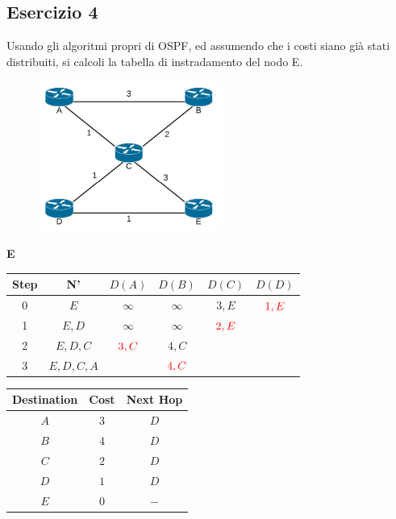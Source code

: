 \documentclass[10pt]{article}
\begin{document}
	\subsection{Esercizio 4}
	Usando gli algoritmi propri di OSPF, ed assumendo che i costi siano già stati distribuiti, si calcoli la tabella di instradamento del nodo E.
	\begin{figure}[h]
	\centering
	\includegraphics[width=6cm]{es5}
	\end{figure}
	\begin{center}
	\textbf{E}
 		\begin{tabular}{||c c c c c c||} 
 			\hline
 			Step & N' & $D(A)$ & $D(B)$ & $D(C)$ & $D(D)$ \\[0.5ex] 
 			\hline\hline
 			0 & $E$ & $\infty$ & $\infty$ & $3,E$ & $\color{red} 1,E$ \\
 			\hline
 			1 & $E,D$ & $\infty$ & $\infty$ & $\color{red} 2,E$ & \\
 			\hline
 			2 & $E,D,C$ & $\color{red} 3,C$ & $4,C$ &  & \\
 			\hline
 			3 & $E,D,C,A$ & & $\color{red} 4,C$ & & \\[0.5ex] 
 			\hline
		\end{tabular}
		\quad
		\begin{tabular}{||c || c || c||}
			\hline
 			Destination & Cost & Next Hop\\[0.5ex] 
 			\hline\hline
			$A$ & $3$ & $D$\\
			$B$ & $4$ & $D$\\
 			$C$ & $2$ & $D$\\
			$D$ & $1$ & $D$\\
			$E$ & $0$ & $-$\\[0.5ex] 
			\hline
		\end{tabular}
	\end{center}
	\newpage
\end{document}
